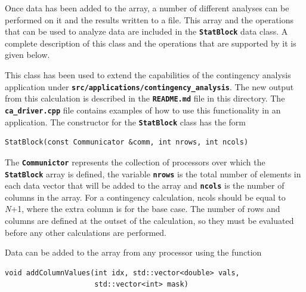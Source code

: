

Once data has been added to the array, a number of different analyses can be performed on it and the results written to a file. This array and the operations that can be used to analyze data are included in the \texttt{\textbf{StatBlock}} data class. A complete description of this class and the operations that are supported by it is given below.

This class has been used to extend the capabilities of the contingency analysis application under \texttt{\textbf{src/applications/contingency\_analysis}}. The new output from this calculation is described in the \texttt{\textbf{README.md}} file in this directory. The \texttt{\textbf{ca\_driver.cpp}} file contains examples of how to use this functionality in an application.
The constructor for the \texttt{\textbf{StatBlock}} class has the form

{
\color{red}
\begin{Verbatim}[fontseries=b]
StatBlock(const Communicator &comm, int nrows, int ncols)
\end{Verbatim}
}

The \texttt{\textbf{Communictor}} represents the collection of processors over which the \texttt{\textbf{StatBlock}} array is defined, the variable \texttt{\textbf{nrows}} is the total number of elements in each data vector that will be added to the array and \texttt{\textbf{ncols}} is the number of columns in the array. For a contingency calculation, ncols should be equal to \textit{N}+1, where the extra column is for the base case. The number of rows and columns are defined at the outset of the calculation, so they must be evaluated before any other calculations are performed.

Data can be added to the array from any processor using the function

{
\color{red}
\begin{Verbatim}[fontseries=b]
void addColumnValues(int idx, std::vector<double> vals,
                     std::vector<int> mask)
\end{Verbatim}
}

